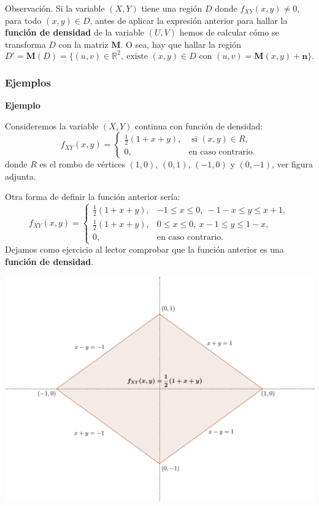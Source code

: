 \documentclass[]{book}
\begin{document}
Observación.
Si la variable \((X,Y)\) tiene una región \(D\) donde \(f_{XY}(x,y)\neq 0\), para todo \((x,y)\in D\), antes de aplicar la expresión anterior para hallar la \textbf{función de densidad} de la variable \((U,V)\) hemos de calcular cómo se transforma \(D\) con la matriz \(\mathbf{M}\). O sea, hay que hallar la región
\[
D'=\mathbf{M}(D)=\{(u,v)\in\mathbb{R}^2,\ \mbox{existe $(x,y)\in D$ con } (u,v)=\mathbf{M}(x,y)+\mathbf{n}\}.
\]

\hypertarget{ejemplos-12}{%
\subsubsection{Ejemplos}\label{ejemplos-12}}

\textbf{Ejemplo}

Consideremos la variable \((X,Y)\) continua con función de densidad:
\[
f_{XY}(x,y)=\begin{cases}
\frac{1}{2}(1+x+y), & \mbox{ si }(x,y)\in R, \\
0, & \mbox{en caso contrario.}
\end{cases}
\]
donde \(R\) es el rombo de vértices \((1,0)\), \((0,1)\), \((-1,0)\) y \((0,-1)\), ver figura adjunta.

Otra forma de definir la función anterior sería:
\[
f_{XY}(x,y)=\begin{cases}
\frac{1}{2}(1+x+y), & -1\leq x\leq 0,\ -1-x\leq y\leq x+1, \\
\frac{1}{2}(1+x+y), & 0\leq x\leq 0,\ x-1\leq y\leq 1-x, \\
0, & \mbox{en caso contrario.}
\end{cases}
\]
Dejamos como ejercicio al lector comprobar que la función anterior es una \textbf{función de densidad}.

\includegraphics{Images/EjTranLineal.png}
\end{document}
